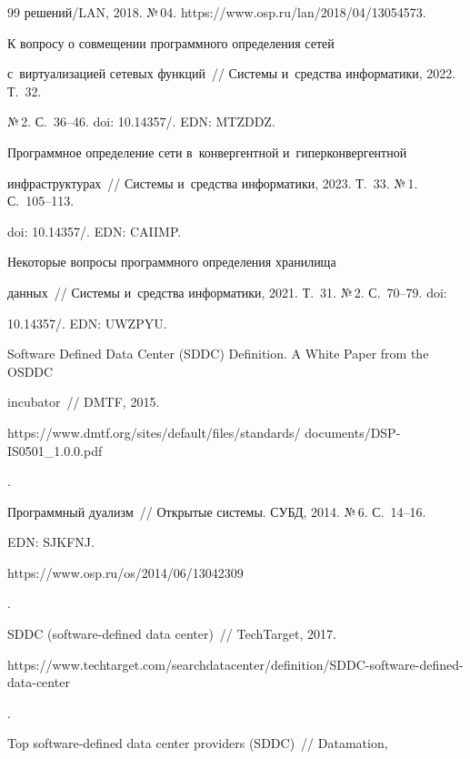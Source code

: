 {{\begin{thebibliography}{99}
решений\!/\!LAN, 2018. №\,04. {\sf https://www.osp.ru/lan/2018/04/13054573}.







 К вопросу о совмещении программного определения сетей 


с~виртуализацией сетевых функций~/\!\!/ Системы и~средства информатики, 2022. Т.~32. 


№\,2. С.~36--46. doi: 10.14357\!/. EDN: MTZDDZ.




 Программное определение сети в~конвергентной и~гиперконвергентной 


инфраструктурах~/\!\!/ Системы и~средства информатики, 2023. Т.~33. №\,1. С.~105--113. 


doi: 10.14357\!/. EDN: CAIIMP.




 Некоторые вопросы программного определения хранилища 


данных~/\!\!/ Системы и~средства информатики, 2021. Т.~31. №\,2. С.~70--79. doi: 


10.14357\!/. EDN: UWZPYU.




Software Defined Data Center (SDDC) Definition. A White Paper from the OSDDC 


incubator~/\!\!/ DMTF, 2015. {\sf  


https://www.dmtf.org/sites/default/files/standards/ documents/DSP-IS0501\_1.0.0.pdf}. 




 Программный дуализм~/\!\!/ Открытые системы. СУБД, 2014. №\,6. С.~14--16.


EDN: SJKFNJ. {\sf 


https://www.osp.ru/os/2014/06/13042309}.




 SDDC (software-defined data center)~/\!\!/ TechTarget, 2017. {\sf 


https://www.\linebreak  techtarget.com/searchdatacenter/definition/SDDC-software-defined-data-center}.




 Top software-defined data center providers (SDDC)~/\!\!/ Datamation, 



\end{thebibliography}}}
